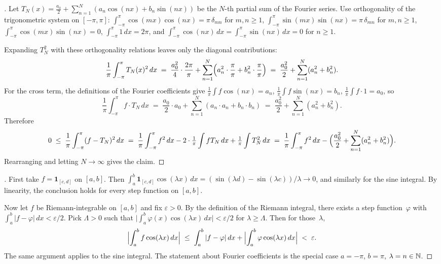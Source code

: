 \begin{proof}[]
Let $T_N(x) = \tfrac{a_0}{2} + \sum_{n=1}^{N} (a_n \cos(nx) + b_n \sin(nx))$
be the $N$-th partial sum of the Fourier series. Use orthogonality of
the trigonometric system on $[-\pi, \pi]$:
$\int_{-\pi}^{\pi} \cos(mx)\cos(nx) = \pi\,\delta_{mn}$ for $m, n \ge 1$,
$\int_{-\pi}^{\pi} \sin(mx)\sin(nx) = \pi\,\delta_{mn}$ for $m, n \ge 1$,
$\int_{-\pi}^{\pi} \cos(mx)\sin(nx) = 0$,
$\int_{-\pi}^{\pi} 1\,dx = 2\pi$, and
$\int_{-\pi}^{\pi} \cos(nx)\,dx = \int_{-\pi}^{\pi} \sin(nx)\,dx = 0$
for $n \ge 1$.

Expanding $T_N^2$ with these orthogonality relations leaves only the
diagonal contributions:
\[
  \frac{1}{\pi} \int_{-\pi}^{\pi} T_N(x)^2\, dx
  \;=\; \frac{a_0^2}{4} \cdot \frac{2\pi}{\pi} + \sum_{n=1}^{N}\Bigl(a_n^2 \cdot \frac{\pi}{\pi} + b_n^2 \cdot \frac{\pi}{\pi}\Bigr)
  \;=\; \frac{a_0^2}{2} + \sum_{n=1}^{N}(a_n^2 + b_n^2).
\]
For the cross term, the definitions of the Fourier coefficients give
$\tfrac{1}{\pi} \int f \cos(nx) = a_n$, $\tfrac{1}{\pi} \int f \sin(nx) = b_n$,
$\tfrac{1}{\pi} \int f \cdot 1 = a_0$, so
\[
  \frac{1}{\pi} \int_{-\pi}^{\pi} f \cdot T_N\, dx
  \;=\; \frac{a_0}{2} \cdot a_0 + \sum_{n=1}^{N}(a_n \cdot a_n + b_n \cdot b_n)
  \;=\; \frac{a_0^2}{2} + \sum_{n=1}^{N}(a_n^2 + b_n^2).
\]
Therefore
\[
  0 \;\le\; \frac{1}{\pi} \int_{-\pi}^{\pi} (f - T_N)^2\, dx
  \;=\; \frac{1}{\pi} \int_{-\pi}^{\pi} f^2\, dx - 2 \cdot \tfrac{1}{\pi} \int f T_N\, dx + \tfrac{1}{\pi} \int T_N^2\, dx
  \;=\; \frac{1}{\pi} \int_{-\pi}^{\pi} f^2\, dx
  - \Bigl(\frac{a_0^2}{2} + \sum_{n=1}^{N} (a_n^2 + b_n^2)\Bigr).
\]
Rearranging and letting $N \to \infty$ gives the claim.
\end{proof}

\begin{proof}[]
First take $f = \mathbf{1}_{[c, d]}$ on $[a, b]$. Then
$\int_{a}^{b} \mathbf{1}_{[c, d]} \cos(\lambda x)\, dx = (\sin(\lambda d) - \sin(\lambda c))/\lambda \to 0$,
and similarly for the sine integral. By linearity, the conclusion holds
for every step function on $[a, b]$.

Now let $f$ be Riemann-integrable on $[a, b]$ and fix
$\varepsilon > 0$. By the definition of the Riemann integral, there
exists a step function~$\varphi$ with
$\int_a^b |f - \varphi|\, dx < \varepsilon/2$. Pick $\Lambda > 0$ such
that $\bigl|\int_a^b \varphi(x) \cos(\lambda x)\, dx\bigr| < \varepsilon/2$
for $\lambda \ge \Lambda$. Then for those~$\lambda$,
\[
  \Bigl|\int_a^b f \cos(\lambda x)\, dx\Bigr|
  \;\le\; \int_a^b |f - \varphi|\, dx + \Bigl|\int_a^b \varphi \cos(\lambda x)\, dx\Bigr|
  \;<\; \varepsilon.
\]
The same argument applies to the sine integral. The statement about
Fourier coefficients is the special case $a = -\pi$, $b = \pi$,
$\lambda = n \in \mathbb{N}$.
\end{proof}

